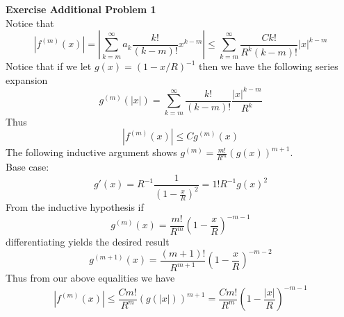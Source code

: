 \documentclass[12pt]{article}
\newenvironment{ques}[1]{\textbf{Exercise #1}\vspace{1 mm}\\ }{\bigskip}
\theoremstyle{definition}
\renewcommand{\l}{\left }
\renewcommand{\r}{\right }
\begin{document}
\begin{ques}{Additional Problem 1}
	Notice that
	$$\l|f^{(m)}(x)\r| = \l|\sum_{k = m}^\infty a_k \frac{k!}{(k-m)!}x^{k-m}
	\r| \leq \sum_{k = m}^\infty \frac{Ck!}{R^k(k-m)!}|x|^{k-m}$$
	Notice that if we let $g(x) = (1 - x/R)^{-1}$ then we have the following
	series expansion
	$$g^{(m)}(|x|) = \sum_{k=m}^\infty \frac{k!}{(k-m)!}\frac{|x|^{k-m}}{R^k}$$
	Thus
	$$|f^(m)(x)| \leq Cg^{(m)}(x)$$
	The following inductive argument shows $g^{(m)} = \frac{m!}{R^m}(g(x))^{m+1}$.\\
	Base case:
	$$g'(x) = R^{-1}\frac{1}{(1 - \frac x R)^2} = 1!R^{-1}g(x)^2$$
	From the inductive hypothesis if
	$$g^{(m)}(x) = \frac{m!}{R^m}\l(1 - \frac x R\r)^{-m - 1}$$
	differentiating yields the desired result
	$$g^{(m+1)}(x) = \frac{(m+1)!}{R^{m+1}}\l(1 - \frac x R\r)^{-m - 2}$$
	Thus from our above equalities we have
	$$\l|f^{(m)}(x)\r| \leq \frac{Cm!}{R^m}(g(|x|))^{m + 1} =
	\frac{Cm!}{R^m}\l(1 - \frac{|x|}{R}\r)^{-m - 1}$$
\end{ques}
\end{document}
